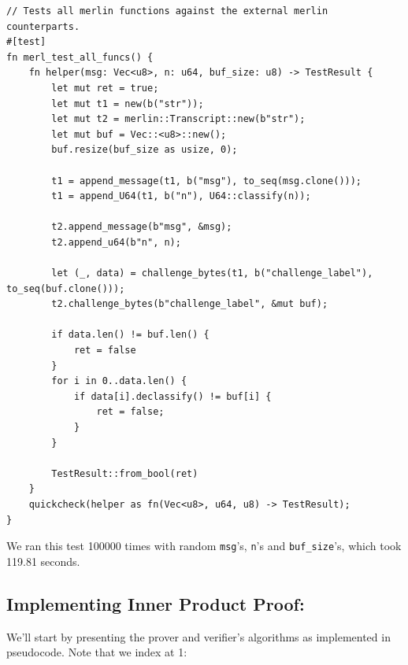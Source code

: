 \documentclass{article}
\begin{document}
\begin{lstlisting}
// Tests all merlin functions against the external merlin counterparts.
#[test]
fn merl_test_all_funcs() {
	fn helper(msg: Vec<u8>, n: u64, buf_size: u8) -> TestResult {
		let mut ret = true;
		let mut t1 = new(b("str"));
		let mut t2 = merlin::Transcript::new(b"str");
		let mut buf = Vec::<u8>::new();
		buf.resize(buf_size as usize, 0);

		t1 = append_message(t1, b("msg"), to_seq(msg.clone()));
		t1 = append_U64(t1, b("n"), U64::classify(n));

		t2.append_message(b"msg", &msg);
		t2.append_u64(b"n", n);

		let (_, data) = challenge_bytes(t1, b("challenge_label"), to_seq(buf.clone()));
		t2.challenge_bytes(b"challenge_label", &mut buf);

		if data.len() != buf.len() {
			ret = false
		}
		for i in 0..data.len() {
			if data[i].declassify() != buf[i] {
				ret = false;
			}
		}

		TestResult::from_bool(ret)
	}
	quickcheck(helper as fn(Vec<u8>, u64, u8) -> TestResult);
}
\end{lstlisting}

We ran this test 100000 times with random \texttt{msg}'s, \texttt{n}'s
and \texttt{buf\_size}'s, which took 119.81 seconds.

\subsection{Implementing Inner Product Proof:} \label{implementing-inner-product-proof}

We'll start by presenting the prover and verifier's algorithms as
implemented in pseudocode. Note that we index at 1:
\end{document}
